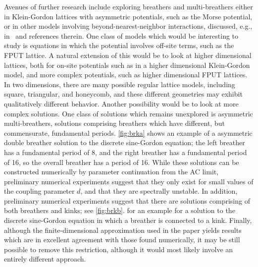 \documentclass[12pt,reqno]{amsart}
\theoremstyle{definition}
\begin{document}
Avenues of further research include exploring breathers and multi-breathers either in Klein-Gordon lattices with asymmetric potentials, such as the Morse potential, or in other models 
involving beyond-nearest-neighbor interactions, discussed, e.g., in~\cite{PENATI201992} and references therein. One class of models which would be interesting to study is equations in which the potential involves off-site terms, such as the FPUT lattice. A natural extension of this would be to look at higher dimensional lattices, both for on-site potentials such as in a higher dimensional Klein-Gordon model, and more complex potentials, such as higher dimensional FPUT lattices. In two dimensions, there are many possible regular lattice models, including square, triangular, and honeycomb, and these different geometries may exhibit qualitatively different behavior. Another possibility would be to look at more complex solutions. One class of solutions which remains unexplored is asymmetric multi-breathers, solutions comprising breathers which have different, but commensurate, fundamental periods. \cref{fig:brka} shows an example of a asymmetric double breather solution to the discrete sine-Gordon equation; the left breather has a fundamental period of 8, and the right breather has a fundamental period of 16, so the overall breather has a period of 16. While these solutions can be constructed numerically by parameter continuation from the AC limit, preliminary numerical experiments suggest that they only exist for small values of the coupling parameter $d$, and that they are spectrally unstable.
In addition, preliminary numerical experiments suggest that there are solutions comprising of both breathers and kinks; see \cref{fig:brkb}. for an example for a solution to the discrete sine-Gordon equation in which a breather is connected to a kink. Finally, although the finite-dimensional approximation used in the paper yields results which are in excellent agreement with those found numerically, it may be still possible to remove this restriction, although it would most likely involve an entirely different approach.
\end{document}
